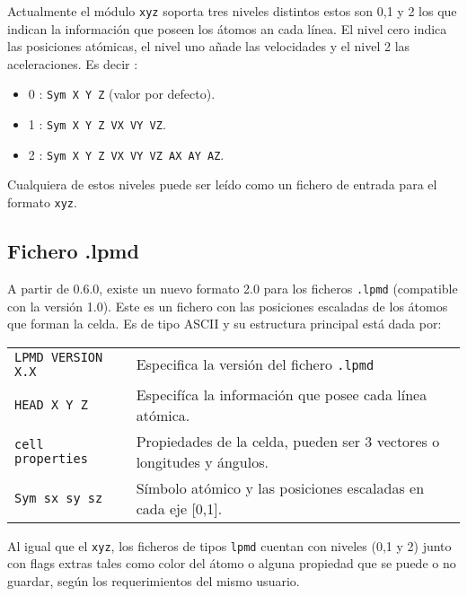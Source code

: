 Actualmente el m\'odulo \verb|xyz| soporta tres niveles distintos estos son 0,1 y 2 los que indican la informaci\'on que poseen los \'atomos an cada l\'inea. El nivel cero indica las posiciones at\'omicas, el nivel uno a\~nade las velocidades y el nivel 2 las aceleraciones. Es decir :

\begin{itemize}
\item 0 : \verb|Sym X Y Z| (valor por defecto).
\item 1 : \verb|Sym X Y Z VX VY VZ|.
\item 2 : \verb|Sym X Y Z VX VY VZ AX AY AZ|.
\end{itemize}

Cualquiera de estos niveles puede ser le\'ido como un fichero de entrada para el formato \verb|xyz|.

\subsection{Fichero .lpmd}

A partir de {\lpmd} 0.6.0, existe un nuevo formato 2.0 para los ficheros \verb|.lpmd| (compatible con la versi\'on 1.0). Este es un fichero con las posiciones escaladas de los \'atomos que forman la celda. Es de tipo ASCII y su estructura principal est\'a dada por:

\begin{center}
 \begin{tabular}{l|l}
 \verb|LPMD VERSION X.X | & Especifica la versi\'on del fichero \verb|.lpmd| \\
 \verb|HEAD X Y Z| & Especif\'ica la informaci\'on que posee cada l\'inea at\'omica. \\
 \verb|cell properties | & Propiedades de la celda, pueden ser 3 vectores o longitudes y \'angulos. \\
 \verb|Sym sx sy sz| & S\'imbolo at\'omico y las posiciones escaladas en cada eje [0,1].\\
\end{tabular}
\end{center}

Al igual que el \verb|xyz|, los ficheros de tipos \verb|lpmd| cuentan con niveles (0,1 y 2) junto con flags extras tales como color del \'atomo o alguna propiedad que se puede o no guardar, seg\'un los requerimientos del mismo usuario.

